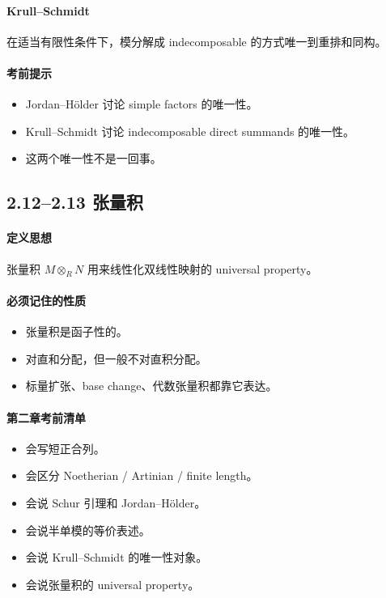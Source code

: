 \documentclass[a4paper]{ctexart}
\begin{document}
\paragraph{Krull--Schmidt}
在适当有限性条件下，模分解成 indecomposable 的方式唯一到重排和同构。

\paragraph{考前提示}
\begin{itemize}
  \item Jordan--H\"older 讨论 simple factors 的唯一性。
  \item Krull--Schmidt 讨论 indecomposable direct summands 的唯一性。
  \item 这两个唯一性不是一回事。
\end{itemize}

\subsection{2.12--2.13 张量积}

\paragraph{定义思想}
张量积 \(M\otimes_R N\) 用来线性化双线性映射的 universal property。

\paragraph{必须记住的性质}
\begin{itemize}
  \item 张量积是函子性的。
  \item 对直和分配，但一般不对直积分配。
  \item 标量扩张、base change、代数张量积都靠它表达。
\end{itemize}

\paragraph{第二章考前清单}
\begin{itemize}
  \item 会写短正合列。
  \item 会区分 Noetherian / Artinian / finite length。
  \item 会说 Schur 引理和 Jordan--H\"older。
  \item 会说半单模的等价表述。
  \item 会说 Krull--Schmidt 的唯一性对象。
  \item 会说张量积的 universal property。
\end{itemize}
\end{document}
